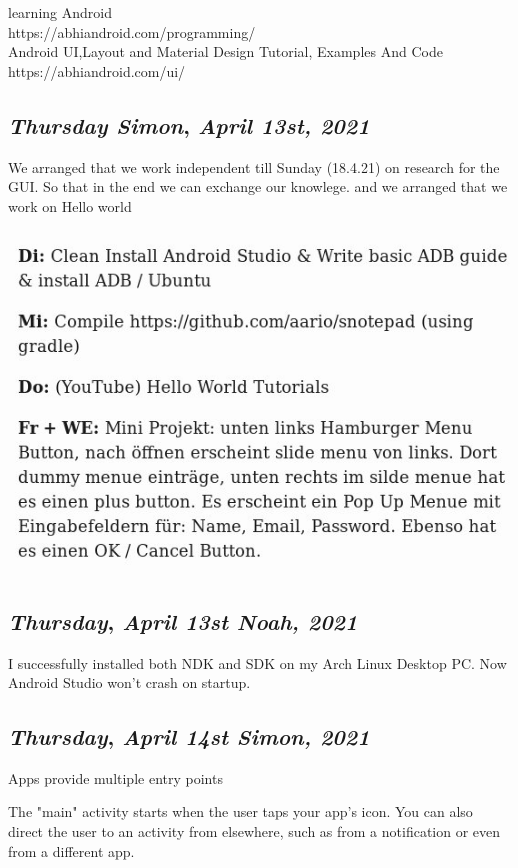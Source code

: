 learning Android \\
https://abhiandroid.com/programming/ \\

Android UI,Layout and Material Design Tutorial, Examples And Code\\
https://abhiandroid.com/ui/



\def\day{\textit{April 13st, 2021}}
\def\weekday{\textit{Thursday Simon}}
\subsection*{\weekday, \day}
We arranged that we work independent till Sunday (18.4.21) on research for the GUI. So that in the end we can exchange our knowlege. 
and we arranged that we work on Hello world 

\includegraphics[width=.8\textwidth]{media/WochenPlan13.4.jpeg}


\def\day{\textit{April 13st Noah, 2021}}
\def\weekday{\textit{Thursday}}
\subsection*{\weekday, \day}

I successfully installed both NDK and SDK on my Arch Linux Desktop PC. Now Android Studio won't crash on startup.


\def\day{\textit{April 14st Simon, 2021}}
\def\weekday{\textit{Thursday}}
\subsection*{\weekday, \day}
Apps provide multiple entry points

The "main" activity starts when the user taps your app's icon. You can also direct the user to an activity from elsewhere, such as from a notification or even from a different app.

